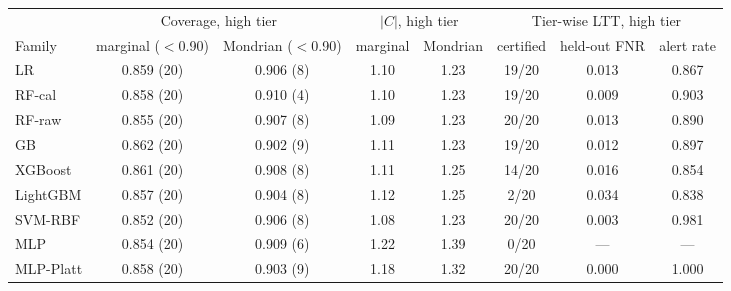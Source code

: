 \begin{tabular}{@{}lccccccc@{}}
\toprule
 & \multicolumn{2}{c}{Coverage, high tier} & \multicolumn{2}{c}{$|C|$, high tier} & \multicolumn{3}{c}{Tier-wise LTT, high tier} \\
\cmidrule(lr){2-3}\cmidrule(lr){4-5}\cmidrule(lr){6-8}
Family & marginal ($<$0.90) & Mondrian ($<$0.90) & marginal & Mondrian & certified & held-out FNR & alert rate \\
\midrule
LR & 0.859 (20) & 0.906 (8) & 1.10 & 1.23 & 19/20 & 0.013 & 0.867 \\
RF-cal & 0.858 (20) & 0.910 (4) & 1.10 & 1.23 & 19/20 & 0.009 & 0.903 \\
RF-raw & 0.855 (20) & 0.907 (8) & 1.09 & 1.23 & 20/20 & 0.013 & 0.890 \\
GB & 0.862 (20) & 0.902 (9) & 1.11 & 1.23 & 19/20 & 0.012 & 0.897 \\
XGBoost & 0.861 (20) & 0.908 (8) & 1.11 & 1.25 & 14/20 & 0.016 & 0.854 \\
LightGBM & 0.857 (20) & 0.904 (8) & 1.12 & 1.25 & 2/20 & 0.034 & 0.838 \\
SVM-RBF & 0.852 (20) & 0.906 (8) & 1.08 & 1.23 & 20/20 & 0.003 & 0.981 \\
MLP & 0.854 (20) & 0.909 (6) & 1.22 & 1.39 & 0/20 & --- & --- \\
MLP-Platt & 0.858 (20) & 0.903 (9) & 1.18 & 1.32 & 20/20 & 0.000 & 1.000 \\
\bottomrule
\end{tabular}
